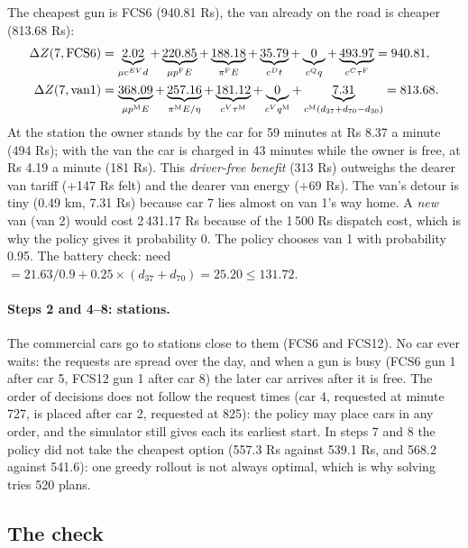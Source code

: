 The cheapest gun is FCS6 (940.81 Rs), the van already on the road is cheaper (813.68 Rs):
\[
\begin{aligned}
\Delta Z(7,\text{FCS6})&=\underbrace{2.02}_{\mu c^{EV}d}+\underbrace{220.85}_{\mu p^{\mathrm{F}} E}+\underbrace{188.18}_{\pi^{\mathrm{F}} E}+\underbrace{35.79}_{c^Dt}+\underbrace{0}_{c^Qq}+\underbrace{493.97}_{c^C\tau^{\mathrm{F}}}=940.81,\\
\Delta Z(7,\text{van1})&=\underbrace{368.09}_{\mu p^{\mathrm{M}} E}+\underbrace{257.16}_{\pi^{\mathrm{M}} E/\eta}+\underbrace{181.12}_{c^V\tau^{\mathrm{M}}}+\underbrace{0}_{c^Vq^{\mathrm{M}}}+\underbrace{7.31}_{c^{\mathrm{M}}(d_{37}+d_{70}-d_{30})}=813.68 .
\end{aligned}
\]
At the station the owner stands by the car for 59 minutes at Rs 8.37 a minute (494 Rs); with the van the car is charged in 43 minutes while the owner is free, at Rs 4.19 a minute (181 Rs). This \emph{driver-free benefit} (313 Rs) outweighs the dearer van tariff (+147 Rs felt) and the dearer van energy (+69 Rs). The van's detour is tiny (0.49 km, 7.31 Rs) because car 7 lies almost on van 1's way home. A \emph{new} van (van 2) would cost 2\,431.17 Rs because of the 1\,500 Rs dispatch cost, which is why the policy gives it probability 0. The policy chooses van 1 with probability 0.95. The battery check: need $=21.63/0.9+0.25\times(d_{37}+d_{70})=25.20\le131.72$.

\paragraph{Steps 2 and 4--8: stations.} The commercial cars go to stations close to them (FCS6 and FCS12). No car ever waits: the requests are spread over the day, and when a gun is busy (FCS6 gun 1 after car 5, FCS12 gun 1 after car 8) the later car arrives after it is free. The order of decisions does not follow the request times (car 4, requested at minute 727, is placed after car 2, requested at 825): the policy may place cars in any order, and the simulator still gives each its earliest start. In steps 7 and 8 the policy did not take the cheapest option (557.3 Rs against 539.1 Rs, and 568.2 against 541.6): one greedy rollout is not always optimal, which is why solving tries 520 plans.

\subsection{The check}

\begin{table}[H]
\centering
\caption{The six parts of $Z$ recomputed by the independent checker (), against the sum of the eight cost increases of the simulator.}

\end{table}

